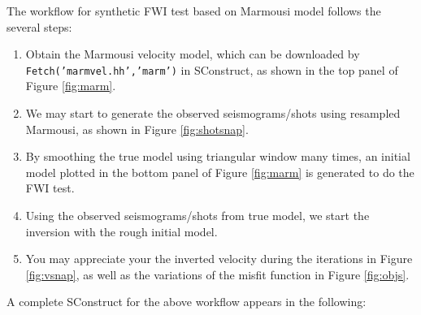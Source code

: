 The workflow for synthetic FWI test based on Marmousi model follows the several steps:
\begin{enumerate}
 \item Obtain the Marmousi velocity model, which can be downloaded by  \texttt{Fetch('marmvel.hh','marm')} in SConstruct, as shown in the top panel of Figure \ref{fig:marm}.
 
 \item We may start to generate the observed seismograms/shots using resampled Marmousi, as shown in Figure \ref{fig:shotsnap}.
 
 \item By smoothing the true model using triangular window many times, an initial model plotted in the bottom panel of Figure \ref{fig:marm} is generated to do the FWI test.
 
 \item Using the observed seismograms/shots from true model, we start the inversion with the rough initial model.
 
 \item  You may appreciate your the inverted velocity during the iterations in Figure \ref{fig:vsnap}, as well as the variations of the misfit function in Figure \ref{fig:objs}.
\end{enumerate}
A complete SConstruct for the above workflow appears in the following:
\lstset{language=python,numbers=left,numberstyle=\tiny,showstringspaces=false}






 

